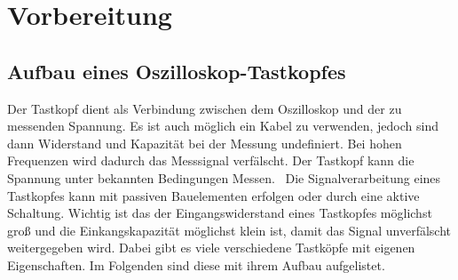 \chapter{Vorbereitung}
    \section{Aufbau eines Oszilloskop-Tastkopfes}
        Der Tastkopf dient als Verbindung zwischen dem Oszilloskop und der zu messenden Spannung. Es ist auch möglich ein Kabel zu verwenden, jedoch sind dann Widerstand und Kapazität bei der Messung undefiniert. Bei hohen Frequenzen wird dadurch das Messsignal verfälscht. Der Tastkopf kann die Spannung unter bekannten Bedingungen Messen.~\cite{tastkopf_deniz}
        Die Signalverarbeitung eines Tastkopfes kann mit passiven Bauelementen erfolgen oder durch eine aktive Schaltung. Wichtig ist das der Eingangswiderstand eines Tastkopfes möglichst groß und die Einkangskapazität möglichst klein ist, damit das Signal unverfälscht weitergegeben wird. Dabei gibt es viele verschiedene Tastköpfe mit eigenen Eigenschaften. Im Folgenden sind diese mit ihrem Aufbau aufgelistet.~\cite{tastkopf_wiki}


